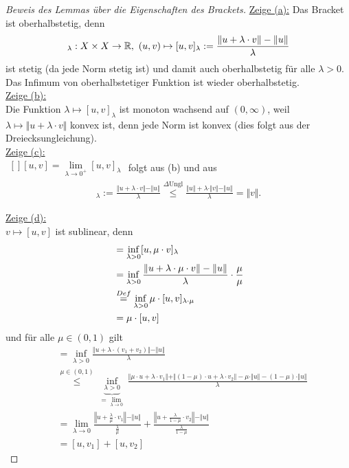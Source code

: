 \begin{proof}[Beweis des Lemmas über die Eigenschaften des Brackets]\enter
\underline{Zeige (a):} Das Bracket ist oberhalbstetig, denn
\begin{align*}
[\cdot,\cdot]_\lambda:X\times X\to\R,~(u,v)\mapsto[u,v]_\lambda:=\frac{\Vert u+\lambda\cdot v\Vert - \Vert u\Vert}{\lambda}
\end{align*}
ist stetig (da jede Norm stetig ist) und damit auch oberhalbstetig für alle $\lambda>0$. Das Infimum von oberhalbstetiger Funktion ist wieder oberhalbstetig.\\

\underline{Zeige (b):}\\
Die Funktion $\lambda\mapsto[u,v]_\lambda$ ist monoton wachsend auf $(0,\infty)$, weil $\lambda\mapsto\Vert u+\lambda\cdot v\Vert$ konvex ist, denn jede Norm ist konvex (dies folgt aus der Dreiecksungleichung).\\

\underline{Zeige (c):}\\
$\begin{aligned}[]
[u,v]=\lim\limits_{\lambda\to0^+}[u,v]_\lambda
\end{aligned}$ folgt aus (b) und aus
\begin{align*}
[u,v]_\lambda:=\frac{\Vert u+\lambda\cdot v\Vert-\Vert u\Vert}{\lambda}
\stackrel{\Delta\text{Ungl}}{\leq}
\frac{\Vert u\Vert+\lambda\cdot\Vert v\Vert-\Vert u\Vert}{\lambda}
=\Vert v\Vert.
\end{align*}

\underline{Zeige (d):}\\
$v\mapsto[u,v]$ ist sublinear, denn
\begin{align*}
[u,\mu\cdot v]
&=
\inf\limits_{\lambda>0}[u,\mu\cdot v]_\lambda\\
&=\inf\limits_{\lambda>0}\frac{\Vert u+\lambda\cdot\mu\cdot v\Vert-\Vert u\Vert}{\lambda}\cdot\frac{\mu}{\mu}\\
&\stackeq{Def}
\inf\limits_{\lambda>0}\mu\cdot[u,v]_{\lambda\cdot\mu}\\
&=\mu\cdot[u,v]
\end{align*}
und für alle $\mu\in(0,1)$ gilt
\begin{align*}
[u,v_1+v_2]
&=
\inf\limits_{\lambda>0}\frac{\Vert u+\lambda\cdot(v_1+v_2)\Vert-\Vert u\Vert}{\lambda}\\
&\stackrel{\mu\in(0,1)}{\leq}
\underbrace{\inf\limits_{\lambda>0}}_{=\lim\limits_{\lambda\to0}}
\frac{\Vert\mu\cdot u+\lambda\cdot v_1\Vert+\Vert(1-\mu)\cdot u+\lambda\cdot v_2\Vert-\mu\cdot\Vert u\Vert-(1-\mu)\cdot\Vert u\Vert}{\lambda}\\
&=\lim\limits_{\lambda\to0}\frac{\left\Vert u+\frac{\lambda}{\mu}\cdot v_1\right\Vert-\Vert u\Vert}{\frac{\lambda}{\mu}}+\frac{\left\Vert u+\frac{\lambda}{1-\mu}\cdot v_2\right\Vert-\Vert u\Vert}{\frac{\lambda}{1-\mu}}\\
&=[u,v_1]+[u,v_2]
\end{align*}


\end{proof}
